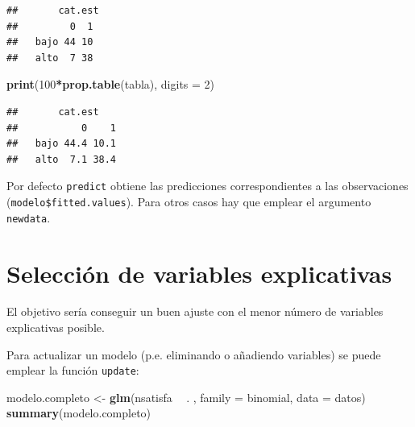 \documentclass[]{book}
\newenvironment{Shaded}{\begin{snugshade}}{\end{snugshade}}
\newcommand{\DataTypeTok}[1]{\textcolor[rgb]{0.13,0.29,0.53}{#1}}
\newcommand{\DecValTok}[1]{\textcolor[rgb]{0.00,0.00,0.81}{#1}}
\newcommand{\FloatTok}[1]{\textcolor[rgb]{0.00,0.00,0.81}{#1}}
\newcommand{\KeywordTok}[1]{\textcolor[rgb]{0.13,0.29,0.53}{\textbf{#1}}}
\newcommand{\NormalTok}[1]{#1}
\newcommand{\OperatorTok}[1]{\textcolor[rgb]{0.81,0.36,0.00}{\textbf{#1}}}
\newcommand{\StringTok}[1]{\textcolor[rgb]{0.31,0.60,0.02}{#1}}
\begin{document}
\begin{Shaded}
\end{Shaded}

\begin{verbatim}
##       cat.est
##         0  1
##   bajo 44 10
##   alto  7 38
\end{verbatim}

\begin{Shaded}
\begin{Highlighting}[]
\KeywordTok{print}\NormalTok{(}\DecValTok{100}\OperatorTok{*}\KeywordTok{prop.table}\NormalTok{(tabla), }\DataTypeTok{digits =} \DecValTok{2}\NormalTok{)}
\end{Highlighting}
\end{Shaded}

\begin{verbatim}
##       cat.est
##           0    1
##   bajo 44.4 10.1
##   alto  7.1 38.4
\end{verbatim}

Por defecto \texttt{predict} obtiene las predicciones correspondientes a las observaciones (\texttt{modelo\$fitted.values}). Para otros casos hay que emplear el argumento \texttt{newdata}.

\hypertarget{seleccion-de-variables-explicativas-1}{%
\section{Selección de variables explicativas}\label{seleccion-de-variables-explicativas-1}}

El objetivo sería conseguir un buen ajuste con el menor número de variables explicativas posible.

Para actualizar un modelo (p.e. eliminando o añadiendo variables) se puede emplear la función \texttt{update}:

\begin{Shaded}
\begin{Highlighting}[]
\NormalTok{modelo.completo <-}\StringTok{ }\KeywordTok{glm}\NormalTok{(nsatisfa }\OperatorTok{~}\StringTok{ }\NormalTok{. , }\DataTypeTok{family =}\NormalTok{ binomial, }\DataTypeTok{data =}\NormalTok{ datos)}
\KeywordTok{summary}\NormalTok{(modelo.completo)}
\end{Highlighting}
\end{Shaded}
\end{document}
